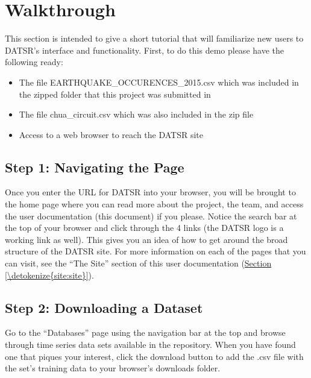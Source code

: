 \documentclass[letterpaper,10pt,english,openany,oneside]{sphinxmanual}
\begin{document}
\sphinxstepscope


\chapter{Walkthrough}
\label{\detokenize{walkthrough:walkthrough}}\label{\detokenize{walkthrough:id1}}\label{\detokenize{walkthrough::doc}}
\sphinxAtStartPar
This section is intended to give a short tutorial that will familiarize new users to DATSR’s interface and functionality. First, to do this demo please have the following ready:
\begin{itemize}
\item {} 
\sphinxAtStartPar
The file EARTHQUAKE\_OCCURENCES\_2015.csv which was included in the zipped folder that this project was submitted in

\item {} 
\sphinxAtStartPar
The file chua\_circuit.csv which was also included in the zip file

\item {} 
\sphinxAtStartPar
Access to a web browser to reach the DATSR site

\end{itemize}


\section{Step 1: Navigating the Page}
\label{\detokenize{walkthrough:step-1-navigating-the-page}}
\sphinxAtStartPar
Once you enter the URL for DATSR into your browser, you will be brought to the home page where you can read more about the project, the team, and access the user documentation (this document) if you please. Notice the search bar at the top of your browser and click through the 4 links (the DATSR logo is a working link as well). This gives you an idea of how to get around the broad structure of the DATSR site. For more information on each of the pages that you can visit, see the “The Site” section of this user documentation (\hyperref[\detokenize{site:site}]{Section \ref{\detokenize{site:site}}}).


\section{Step 2: Downloading a Dataset}
\label{\detokenize{walkthrough:step-2-downloading-a-dataset}}
\sphinxAtStartPar
Go to the “Databases” page using the navigation bar at the top and browse through time series data sets available in the repository. When you have found one that piques your interest, click the download button to add the .csv file with the set’s training data to your browser’s downloads folder.
\end{document}
